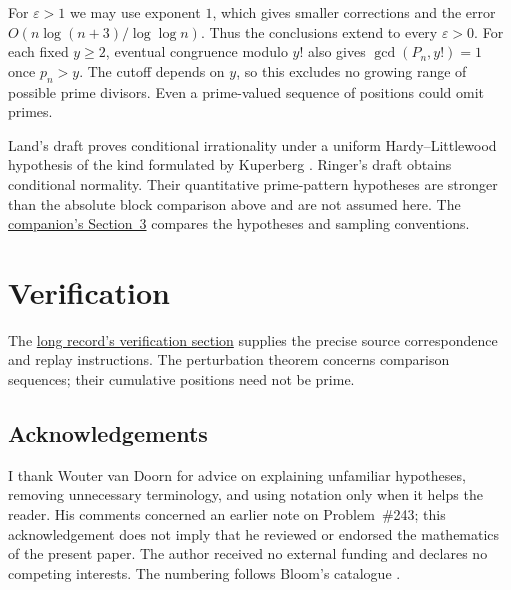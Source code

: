 \documentclass[11pt]{article}
\begin{document}
For $\varepsilon>1$ we may use exponent $1$, which gives smaller
corrections and the error $O(n\log(n+3)/\log\log n)$.  Thus the conclusions
extend to every $\varepsilon>0$.  For each fixed $y\ge2$, eventual
congruence modulo $y!$ also gives $\gcd(P_n,y!)=1$ once $p_n>y$.
The cutoff depends on $y$, so this excludes no growing range of possible
prime divisors.  Even a prime-valued sequence of positions could omit primes.

Land's draft \cite[Theorem~2]{land2026} proves conditional irrationality
under a uniform Hardy--Littlewood hypothesis of the kind formulated by
Kuperberg \cite[Conjecture~1.3]{kuperberg2023}.  Ringer's draft
\cite{ringer2026} obtains conditional normality.  Their quantitative
prime-pattern hypotheses are stronger than the absolute block comparison
above and are not assumed here.  The
\href{erdos251-prime-gap-reasoning-surface.pdf\#context}{companion's Section~3}
compares the hypotheses and sampling conventions.

\section*{Verification}
\evidenceparagraph{\evidencerecordurl}
The \href{erdos251-prime-gap-reasoning-surface.pdf\#scope-verification}
{long record's verification section} supplies the precise source
correspondence and replay instructions. The perturbation theorem concerns
comparison sequences; their cumulative positions need not be prime.

\subsection*{Acknowledgements}
I thank Wouter van Doorn for advice on explaining unfamiliar hypotheses,
removing unnecessary terminology, and using notation only when it helps
the reader.  His comments concerned an earlier note on Problem~\#243;
this acknowledgement does not imply that he reviewed or endorsed the
mathematics of the present paper.
The author received no external funding and declares no competing interests.
The numbering follows Bloom's catalogue \cite{erdosproblems}.
\end{document}
